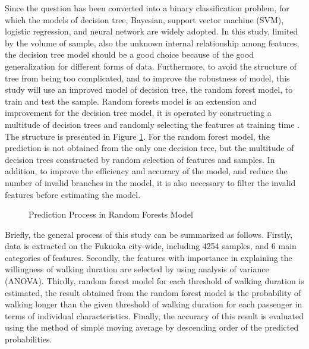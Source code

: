 \documentclass[sustainability,article,submit,moreauthors,pdftex,10pt,a4paper]{Definitions/mdpi}
\begin{document}
%
Since the question has been converted into a binary classification problem, for which the models of decision tree, Bayesian, support vector machine (SVM), logistic regression, and neural network are widely adopted. In this study, limited by the volume of sample, also the unknown internal relationship among features, the decision tree model should be a good choice because of the good generalization for different forms of data. Furthermore, to avoid the structure of tree from being too complicated, and to improve the robustness of model, this study will use an improved model of decision tree, the random forest model, to train and test the sample. Random forests model is an extension and improvement for the decision tree model, it is operated by constructing a multitude of decision trees and randomly selecting the features at training time \cite{ho1995random,ho1998random}. The structure is presented in Figure \ref{fig:RandomForests}. For the random forest model, the prediction is not obtained from the only one decision tree, but the multitude of decision trees constructed by random selection of features and samples. In addition, to improve the efficiency and accuracy of the model, and reduce the number of invalid branches in the model, it is also necessary to filter the invalid features before estimating the model.

%
\begin{figure}[h]
	\caption{Prediction Process in Random Forests Model}
	\label{fig:RandomForests}
	\centering
\end{figure}

%
Briefly, the general process of this study can be summarized as follows. Firstly, data is extracted on the Fukuoka city-wide, including 4254 samples, and 6 main categories of features. Secondly, the features with importance in explaining the willingness of walking duration are selected by using analysis of variance (ANOVA). Thirdly, random forest model for each threshold of walking duration is estimated, the result obtained from the random forest model is the probability of walking longer than the given threshold of walking duration for each passenger in terms of individual characteristics. Finally, the accuracy of this result is evaluated using the method of simple moving average by descending order of the predicted probabilities.
\end{document}
